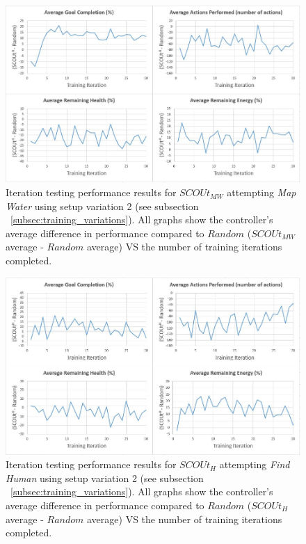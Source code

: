 \begin{figure}[H]
  \includegraphics[width=1.0\columnwidth]{Figures/Results/TrainingVariation2/MapWater.JPG}
  \caption{Iteration testing performance results for $SCOUt_{MW}$ attempting \textit{Map Water} using setup variation 2 (see subsection ~\ref{subsec:training_variations}). All graphs show the controller's average difference in performance compared to $Random$ ($SCOUt_{MW}$ average - $Random$ average) VS the number of training iterations completed.}
  \label{fig:mapwater_training_variation2}
\end{figure}

\begin{figure}[H]
  \includegraphics[width=1.0\columnwidth]{Figures/Results/TrainingVariation2/Hybrid-FindHuman.JPG}
  \caption{Iteration testing performance results for $SCOUt_{H}$ attempting \textit{Find Human} using setup variation 2 (see subsection ~\ref{subsec:training_variations}). All graphs show the controller's average difference in performance compared to $Random$ ($SCOUt_{H}$ average - $Random$ average) VS the number of training iterations completed.}
  \label{fig:hybrid_training_fh_variation2}
\end{figure}

